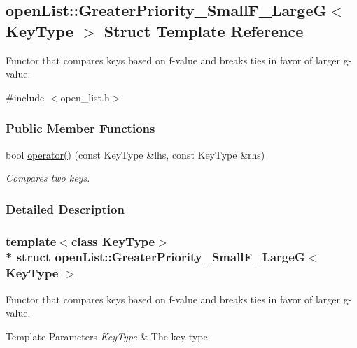 \hypertarget{structopenList_1_1GreaterPriority__SmallF__LargeG}{}\subsection{open\+List\+:\+:Greater\+Priority\+\_\+\+Small\+F\+\_\+\+LargeG$<$ Key\+Type $>$ Struct Template Reference}
\label{structopenList_1_1GreaterPriority__SmallF__LargeG}


Functor that compares keys based on f-\/value and breaks ties in favor of larger g-\/value.  




{\ttfamily \#include $<$open\+\_\+list.\+h$>$}

\subsubsection*{Public Member Functions}
\begin{DoxyCompactItemize}
\item 
bool \hyperlink{structopenList_1_1GreaterPriority__SmallF__LargeG_ae30c58cd2e2052acae1a3c04ae46ad01}{operator()} (const Key\+Type \&lhs, const Key\+Type \&rhs)
\begin{DoxyCompactList}\small\item\em Compares two keys. \end{DoxyCompactList}\end{DoxyCompactItemize}


\subsubsection{Detailed Description}
\subsubsection*{template$<$class Key\+Type$>$\\*
struct open\+List\+::\+Greater\+Priority\+\_\+\+Small\+F\+\_\+\+Large\+G$<$ Key\+Type $>$}

Functor that compares keys based on f-\/value and breaks ties in favor of larger g-\/value. 


\begin{DoxyTemplParams}{Template Parameters}
{\em Key\+Type} & The key type. \\
\hline
\end{DoxyTemplParams}

